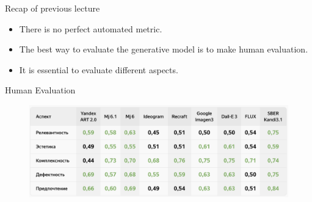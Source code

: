 \begin{frame}{Recap of previous lecture}
	\begin{itemize}
		\item There is no perfect automated metric.
		\item The best way to evaluate the generative model is to make human evaluation.
		\item It is essential to evaluate different aspects.
	\end{itemize}
	\begin{block}{Human Evaluation}
		\begin{figure}
			\includegraphics[width=1.0\linewidth]{figs/yaart_2.5}
		\end{figure}
	\end{block}
\end{frame}
